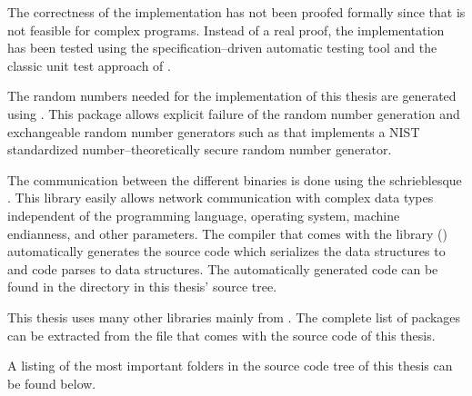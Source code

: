 The correctness of the implementation has not been proofed formally since that
is not feasible for complex programs. Instead of a real proof, the
implementation has been tested using the specification--driven automatic
\JWThaskell{} testing tool \JWTquickcheck{} \cite{quickcheck} and the classic
unit test approach of \JWTLhunit{}.



The random numbers needed for the implementation of this thesis are generated
using \JWTLmonadcryptorandom{}. This package allows explicit failure of the
random number generation and exchangeable random number generators such as
\JWTLdrbg{} that implements a NIST standardized number--theoretically secure
random number generator.


\label{sec:net-comm}

The communication between the different binaries is done using the
schrie\-bl\-esque \JWTXLprotobuf{}. This library easily allows network
communication with complex data types independent of the programming language,
operating system, machine endianness, and other parameters. The \JWThaskell{}
\JWTprotobuf{} compiler  that comes with the \JWThaskell{}
\JWTprotobuf{} library (\JWTprotobufLib{}) automatically generates the
\JWThaskell{} source code which serializes the data structures to
\JWTprotobuf{} and code parses \JWTprotobuf{} to \JWThaskell{} data
structures. The automatically generated code can be found in the directory
 in this thesis' source tree.



This thesis uses many other libraries mainly from \JWTLhackage{}. The
complete list of packages can be extracted from the file
 that comes with the source code of this thesis.


\label{sec:src-org}

A listing of the most important folders in the source code tree of this thesis
can be found below.

